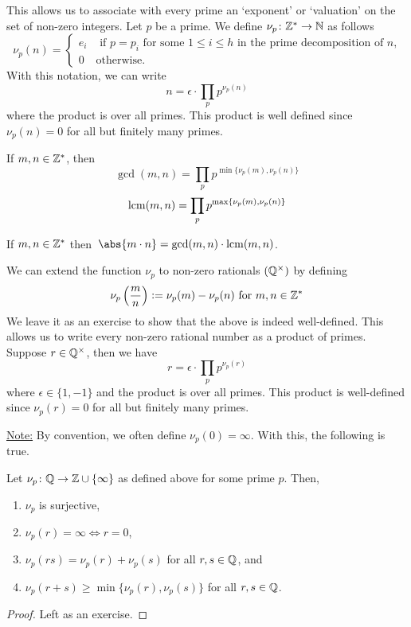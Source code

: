 This allows us to associate with every prime an `exponent' or `valuation' on the set of non-zero integers. Let $p$ be a prime. We define $\nu_p \colon \mathbb{Z}^{\ast} \to \mathbb{N}$ as follows
\[
    \nu_p(n) = \begin{cases}
        e_i & \text{ if } p = p_i \text{ for some $1 \leq i \leq h$ in the prime decomposition of $n$,}\\
        0 & \text{otherwise.}
    \end{cases}
\]
With this notation, we can write
\[
    n = \epsilon \cdot \prod_{p} p^{\nu_p(n)}
\]
where the product is over all primes. This product is well defined since $\nu_p(n) = 0$ for all but finitely many primes.

\begin{prop} \label{prop:gcd-lcm-prime-factorisation}
    If $m,n \in \mathbb{Z}^{\ast}$, then 
    \[
        \gcd(m,n) = \prod_{p} p^{\min\{\nu_p(m), \nu_p(n)\}}
    \]
    \[
        \operatorname{lcm}(m,n) = \prod_{p} p^{\max\{\nu_p(m), \nu_p(n)\}}
    \]
\end{prop}
\begin{cor} \label{cor:prod-gcd-times-lcm}
    If $m,n \in \mathbb{Z}^{\ast}$ then $\, \abs{m \cdot n} = \gcd(m,n) \cdot \lcm(m,n)$.
\end{cor}
We can extend the function $\nu_p$ to non-zero rationals $(\mathbb{Q}^{\times})$ by defining
\[
    \nu_p\left( \frac{m}{n} \right) \vcentcolon= \nu_p(m) - \nu_p(n) \text{ for } m,n \in \mathbb{Z}^{\ast}
\]
We leave it as an exercise to show that the above is indeed well-defined. This allows us to write every non-zero rational number as a product of primes. Suppose $r \in \mathbb{Q}^{\times}$, then we have
\[
    r = \epsilon \cdot \prod_{p} p^{\nu_p(r)}
\]
where $\epsilon \in \{1,-1\}$ and the product is over all primes. This product is well-defined since $\nu_p(r) = 0$ for all but finitely many primes.

\underline{Note:} By convention, we often define $\nu_p(0) = \infty$. With this, the following is true. 
\begin{prop}  \label{prop:p-val-properties}
    Let $\nu_p \colon \mathbb{Q} \to \mathbb{Z} \cup \{\infty\}$ as defined above for some prime $p$. Then,
    \begin{enumerate}
        \item $\nu_p$ is surjective,
        \item $\nu_p(r) = \infty \iff r = 0$,
        \item $\nu_p(rs) = \nu_p(r) + \nu_p(s)$ for all $r,s \in \mathbb{Q}$, and
        \item $\nu_p(r + s) \geq \min\{\nu_p(r), \nu_p(s)\}$ for all $r,s \in \mathbb{Q}$.
    \end{enumerate}
\end{prop}
\begin{proof}
    Left as an exercise.
\end{proof}

